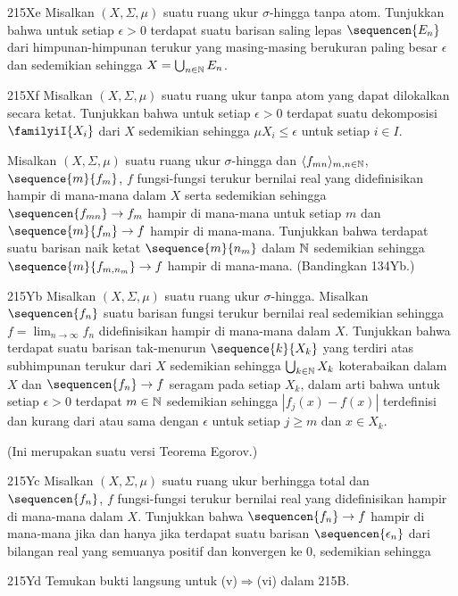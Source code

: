 {\sqheader 215Xe Misalkan $(X,\Sigma,\mu)$ suatu ruang ukur $\sigma$-hingga
tanpa atom. Tunjukkan bahwa untuk setiap $\epsilon>0$ terdapat suatu
barisan saling lepas $\sequencen{E_n}$ dari himpunan-himpunan terukur
yang masing-masing berukuran paling besar $\epsilon$ dan sedemikian
sehingga $X=\bigcup_{n\in\Bbb N}E_n$.

\spheader 215Xf Misalkan $(X,\Sigma,\mu)$ suatu ruang ukur tanpa atom
yang dapat dilokalkan secara ketat. Tunjukkan bahwa untuk setiap
$\epsilon>0$ terdapat suatu dekomposisi $\familyiI{X_i}$ dari $X$
sedemikian sehingga $\mu X_i\le\epsilon$ untuk setiap $i\in I$.

Misalkan $(X,\Sigma,\mu)$ suatu ruang ukur $\sigma$-hingga dan
$\langle f_{mn}\rangle_{m,n\in\Bbb N}$, $\sequence{m}{f_m}$, $f$
fungsi-fungsi terukur bernilai real yang didefinisikan hampir di
mana-mana dalam $X$ serta sedemikian sehingga
$\sequencen{f_{mn}}\to f_m$ hampir di mana-mana untuk setiap $m$ dan
$\sequence{m}{f_m}\to f$ hampir di mana-mana. Tunjukkan bahwa terdapat
suatu barisan naik ketat $\sequence{m}{n_m}$ dalam $\Bbb N$ sedemikian sehingga
$\sequence{m}{f_{m,n_m}}\to f$ hampir di mana-mana. (Bandingkan 134Yb.)

\spheader 215Yb Misalkan $(X,\Sigma,\mu)$ suatu ruang ukur
$\sigma$-hingga. Misalkan $\sequencen{f_n}$ suatu barisan fungsi terukur
bernilai real sedemikian sehingga $f=\lim_{n\to\infty}f_n$ didefinisikan
hampir di mana-mana dalam $X$. Tunjukkan bahwa terdapat suatu barisan
tak-menurun $\sequence{k}{X_k}$ yang terdiri atas subhimpunan terukur dari
$X$ sedemikian sehingga $\bigcup_{k\in\Bbb N}X_k$ koterabaikan dalam
$X$ dan $\sequencen{f_n}\to f$ seragam pada setiap $X_k$, dalam arti
bahwa untuk setiap $\epsilon>0$ terdapat $m\in\Bbb N$ sedemikian
sehingga $|f_j(x)-f(x)|$ terdefinisi dan kurang dari atau sama dengan
$\epsilon$ untuk setiap $j\ge m$ dan $x\in X_k$.

(Ini merupakan suatu versi Teorema Egorov.)

\spheader 215Yc Misalkan $(X,\Sigma,\mu)$ suatu ruang ukur berhingga
total dan $\sequencen{f_n}$, $f$ fungsi-fungsi terukur bernilai real
yang didefinisikan hampir di mana-mana dalam $X$. Tunjukkan bahwa
$\sequencen{f_n}\to f$ hampir di mana-mana jika dan hanya jika terdapat
suatu barisan $\sequencen{\epsilon_n}$ dari bilangan real yang semuanya
positif dan konvergen ke $0$, sedemikian sehingga


\spheader 215Yd Temukan bukti langsung untuk
(v)$\Rightarrow$(vi) dalam 215B.

}%

